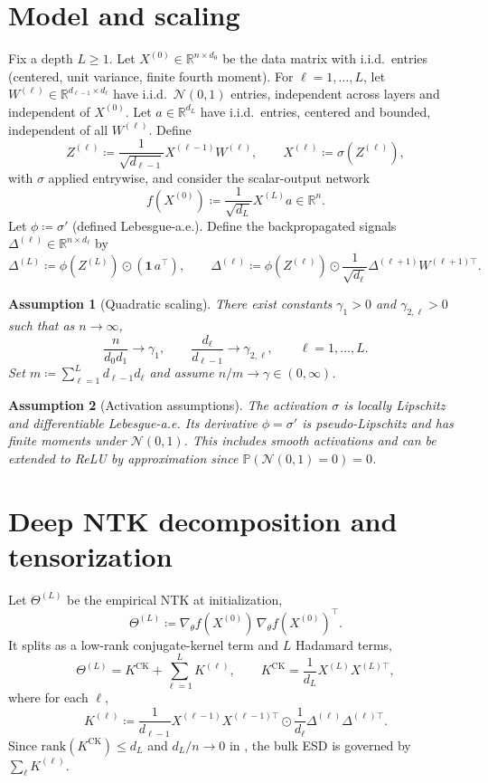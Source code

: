 \documentclass[anon]{colt2026}
\newcommand{\RR}{\mathbb{R}}
\newcommand{\PP}{\mathbb{P}}
\newtheorem{assumption}{Assumption}
\begin{document}
\section{Model and scaling}
\label{sec:model}
Fix a depth $L\geq 1$.
Let $X^{(0)}\in\RR^{n\times d_0}$ be the data matrix with i.i.d.\ entries (centered, unit variance, finite fourth moment).
For $\ell=1,\dots,L$, let $W^{(\ell)}\in\RR^{d_{\ell-1}\times d_\ell}$ have i.i.d.\ $\mathcal{N}(0,1)$ entries, independent across layers and independent of $X^{(0)}$.
Let $a\in\RR^{d_L}$ have i.i.d.\ entries, centered and bounded, independent of all $W^{(\ell)}$.
Define
\[
  Z^{(\ell)} \coloneqq \frac{1}{\sqrt{d_{\ell-1}}}X^{(\ell-1)}W^{(\ell)},\qquad
  X^{(\ell)} \coloneqq \sigma(Z^{(\ell)}),
\]
with $\sigma$ applied entrywise, and consider the scalar-output network
\[
  f(X^{(0)}) \coloneqq \frac{1}{\sqrt{d_L}}X^{(L)}a\in\RR^n.
\]
Let $\phi\coloneqq \sigma'$ (defined Lebesgue-a.e.).
Define the backpropagated signals $\Delta^{(\ell)}\in\RR^{n\times d_\ell}$ by
\[
  \Delta^{(L)} \coloneqq \phi(Z^{(L)})\odot (\mathbf{1}\, a^\top),
  \qquad
  \Delta^{(\ell)} \coloneqq \phi(Z^{(\ell)})\odot \frac{1}{\sqrt{d_\ell}}\Delta^{(\ell+1)}W^{(\ell+1)\top}.
\]

\begin{assumption}[Quadratic scaling]\label{ass:scaling}
There exist constants $\gamma_1>0$ and $\gamma_{2,\ell}>0$ such that as $n\to\infty$,
\[
  \frac{n}{d_0d_1}\to \gamma_1,
  \qquad
  \frac{d_\ell}{d_{\ell-1}}\to \gamma_{2,\ell},
  \qquad \ell=1,\dots,L.
\]
Set $m\coloneqq \sum_{\ell=1}^L d_{\ell-1}d_\ell$ and assume $n/m\to \gamma\in(0,\infty)$.
\end{assumption}

\begin{assumption}[Activation assumptions]\label{ass:activation}
The activation $\sigma$ is locally Lipschitz and differentiable Lebesgue-a.e.
Its derivative $\phi=\sigma'$ is pseudo-Lipschitz and has finite moments under $\mathcal{N}(0,1)$.
This includes smooth activations and can be extended to ReLU by approximation since $\PP(\mathcal{N}(0,1)=0)=0$.
\end{assumption}

\section{Deep NTK decomposition and tensorization}
\label{sec:decomp}
Let $\Theta^{(L)}$ be the empirical NTK at initialization,
\[
  \Theta^{(L)}\coloneqq \nabla_\theta f(X^{(0)})\,\nabla_\theta f(X^{(0)})^\top.
\]
It splits as a low-rank conjugate-kernel term and $L$ Hadamard terms,
\[
  \Theta^{(L)} = K^{\mathrm{CK}} + \sum_{\ell=1}^L K^{(\ell)},
  \qquad
  K^{\mathrm{CK}}=\frac{1}{d_L}X^{(L)}X^{(L)\top},
\]
where for each $\ell$,
\[
  K^{(\ell)} \coloneqq
  \frac{1}{d_{\ell-1}}X^{(\ell-1)}X^{(\ell-1)\top}
  \odot
  \frac{1}{d_\ell}\Delta^{(\ell)}\Delta^{(\ell)\top}.
\]
Since $\mathrm{rank}(K^{\mathrm{CK}})\le d_L$ and $d_L/n\to 0$ in , the bulk ESD is governed by $\sum_{\ell}K^{(\ell)}$.
\end{document}
